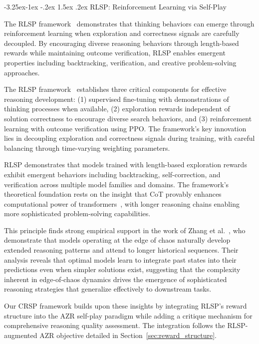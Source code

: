\documentclass[10pt,a4paper]{article}
\makeatletter
\renewcommand\subsection{\@startsection{subsection}{2}{\z@}%
  {-3.25ex\@plus -1ex \@minus -.2ex}%
  {1.5ex \@plus .2ex}%
  {\fontfamily{sourcecodepro}\selectfont\large\bfseries}}
\makeatother
\begin{document}
\subsection{RLSP: Reinforcement Learning via Self-Play}

The RLSP framework~\cite{ye2025emergence} demonstrates that thinking behaviors can emerge through reinforcement learning when exploration and correctness signals are carefully decoupled. By encouraging diverse reasoning behaviors through length-based rewards while maintaining outcome verification, RLSP enables emergent properties including backtracking, verification, and creative problem-solving approaches.

The RLSP framework~\cite{ye2025emergence} establishes three critical components for effective reasoning development: (1) supervised fine-tuning with demonstrations of thinking processes when available, (2) exploration rewards independent of solution correctness to encourage diverse search behaviors, and (3) reinforcement learning with outcome verification using PPO. The framework's key innovation lies in decoupling exploration and correctness signals during training, with careful balancing through time-varying weighting parameters.

RLSP demonstrates that models trained with length-based exploration rewards exhibit emergent behaviors including backtracking, self-correction, and verification across multiple model families and domains. The framework's theoretical foundation rests on the insight that CoT provably enhances computational power of transformers~\cite{merrill2023expressive}, with longer reasoning chains enabling more sophisticated problem-solving capabilities.

This principle finds strong empirical support in the work of Zhang et al.~\cite{zhang2024intelligence}, who demonstrate that models operating at the edge of chaos naturally develop extended reasoning patterns and attend to longer historical sequences. Their analysis reveals that optimal models learn to integrate past states into their predictions even when simpler solutions exist, suggesting that the complexity inherent in edge-of-chaos dynamics drives the emergence of sophisticated reasoning strategies that generalize effectively to downstream tasks.

Our CRSP framework builds upon these insights by integrating RLSP's reward structure into the AZR self-play paradigm while adding a critique mechanism for comprehensive reasoning quality assessment. The integration follows the RLSP-augmented AZR objective detailed in Section~\ref{sec:reward_structure}.
\end{document}
